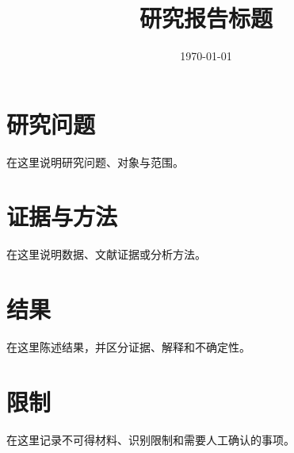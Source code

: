 \documentclass[UTF8,11pt]{ctexart}
\title{研究报告标题}
\author{}
\date{\today}
\begin{document}
\maketitle

\section{研究问题}
在这里说明研究问题、对象与范围。

\section{证据与方法}
在这里说明数据、文献证据或分析方法。

\section{结果}
在这里陈述结果，并区分证据、解释和不确定性。

\section{限制}
在这里记录不可得材料、识别限制和需要人工确认的事项。
\end{document}

